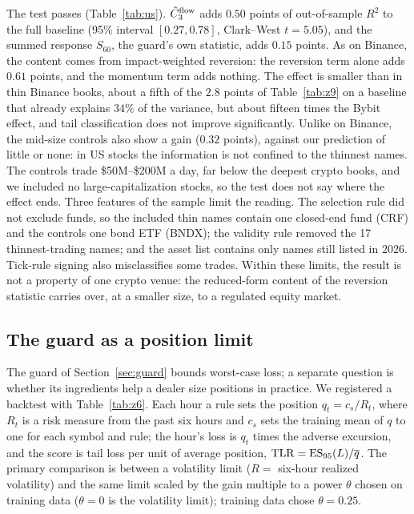 The test passes (Table~\ref{tab:us}). $\hat C_3^{\rm flow}$ adds $0.50$ points of out-of-sample $R^2$ to the full baseline (95\% interval $[0.27,0.78]$, Clark--West $t=5.05$), and the summed response $S_{60}$, the guard's own statistic, adds $0.15$ points. As on Binance, the content comes from impact-weighted reversion: the reversion term alone adds $0.61$ points, and the momentum term adds nothing. The effect is smaller than in thin Binance books, about a fifth of the $2.8$ points of Table~\ref{tab:z9} on a baseline that already explains $34\%$ of the variance, but about fifteen times the Bybit effect, and tail classification does not improve significantly. Unlike on Binance, the mid-size controls also show a gain ($0.32$ points), against our prediction of little or none: in US stocks the information is not confined to the thinnest names. The controls trade \$50M--\$200M a day, far below the deepest crypto books, and we included no large-capitalization stocks, so the test does not say where the effect ends. Three features of the sample limit the reading. The selection rule did not exclude funds, so the included thin names contain one closed-end fund (CRF) and the controls one bond ETF (BNDX); the validity rule removed the 17 thinnest-trading names; and the asset list contains only names still listed in 2026. Tick-rule signing also misclassifies some trades. Within these limits, the result is not a property of one crypto venue: the reduced-form content of the reversion statistic carries over, at a smaller size, to a regulated equity market.

\subsection{The guard as a position limit}\label{sec:backtest}
The guard of Section~\ref{sec:guard} bounds worst-case loss; a separate question is whether its ingredients help a dealer size positions in practice. We registered a backtest with Table~\ref{tab:z6}. Each hour a rule sets the position $q_t=c_s/R_t$, where $R_t$ is a risk measure from the past six hours and $c_s$ sets the training mean of $q$ to one for each symbol and rule; the hour's loss is $q_t$ times the adverse excursion, and the score is tail loss per unit of average position, ${\rm TLR}={\rm ES}_{95}(L)/\overline q$. The primary comparison is between a volatility limit ($R=$ six-hour realized volatility) and the same limit scaled by the gain multiple to a power $\theta$ chosen on training data ($\theta=0$ is the volatility limit); training data chose $\theta=0.25$.

